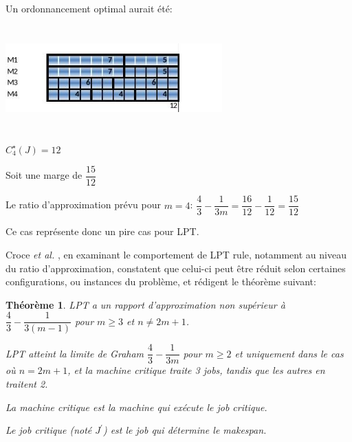 \documentclass[a4paper,12pt]{report}
\theoremstyle{plain}				%
\newtheorem{theoreme1}{Théorème}	%
\theoremstyle{definition}				%
\begin{document}
\bigskip

\begin{minipage}{\linewidth}

\begin{flushleft}
Un ordonnancement optimal aurait été:
\end{flushleft}

{\centering
\includegraphics[width=8.334cm,height=4.034cm]{Biblio_PCmax_Rendu_exLPT_Rev2.jpg}
\par}


\begin{flushleft}
$C_4^{\star}(J)=12$
\end{flushleft}

\end{minipage}

Soit une marge de $\dfrac{15}{12}$

Le ratio d'approximation prévu pour $m=4$:
$\dfrac{4}{3} - \dfrac{1}{3m}=\dfrac{16}{12} - \dfrac{1}{12}=\dfrac{15}{12}$

Ce cas représente donc un pire cas pour LPT.

Croce \textit{et al.}
\cite{della2018longest}, en examinant le comportement de LPT rule,
notamment au niveau du ratio d'approximation, constatent que celui-ci
peut être réduit selon certaines configurations, ou instances du
problème, et rédigent le théorème suivant:

\bigskip

\begin{theoreme1}
  LPT a un rapport d'approximation non supérieur à
  $\dfrac{4}{3} - \dfrac{1}{3(m-1)}$ pour $m \geq 3$ et $n \neq 2m+1$.

  LPT atteint la limite de Graham $\dfrac{4}{3} - \dfrac{1}{3m}$ pour
  $m \geq 2$ et uniquement dans le cas où $n=2m+1$, et la machine
  critique traite 3 jobs, tandis que les autres en traitent 2.

  La machine critique est la machine qui exécute le job critique.

  Le job critique (noté $J^\prime$) est le job qui détermine le
  makespan.
\end{theoreme1}
\end{document}
